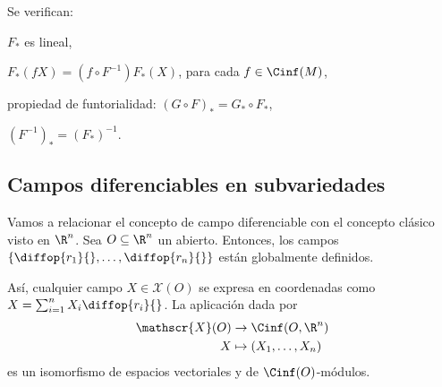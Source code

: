 \begin{nprop}[Propiedades de $F_{*}$]
  Se verifican:
  \begin{nlist}
  \item
    $F_{*}$ es lineal,
  \item
    $F_{*}(fX) = (f\circ F^{-1})F_{*}(X)$, para cada $f\in\Cinf(M)$,
  \item
    propiedad de funtorialidad: $(G\circ F)_{*} = G_{*}\circ F_{*}$,
  \item
    $(F^{-1})_{*} = (F_{*})^{-1}$.
  \end{nlist}
\end{nprop}

\subsection{Campos diferenciables en subvariedades}

Vamos a relacionar el concepto de campo diferenciable con el concepto clásico
visto en $\R^{n}$. Sea $O\subseteq \R^{n}$ un abierto. Entonces, los campos
$\left\{ \diffop{r_{1}}{},\dots, \diffop{r_{n}}{} \right\}$ están globalmente
definidos.

Así, cualquier campo $X\in \mathscr{X}(O)$ se expresa en coordenadas como $X =
\sum_{i=1}^{n} X_{i}\diffop{r_{i}}{}$. La aplicación dada por
\begin{alignat*}{2}
   \mathscr{X}(O) & \to \Cinf(O,\R^{n}) \\
  X & \mapsto (X_{1}, \dots, X_{n}) 
\end{alignat*}
es un isomorfismo de espacios vectoriales y de $\Cinf(O)$-módulos.

